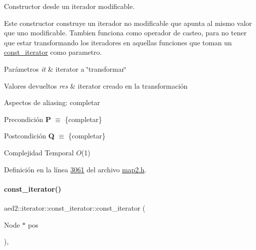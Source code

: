 Constructor desde un iterador modificable. 

Este constructor construye un iterador no modificable que apunta al mismo valor que uno modificable. Tambien funciona como operador de casteo, para no tener que estar transformando los iteradores en aquellas funciones que toman un {\ttfamily \hyperlink{classaed2_1_1iterator_1_1const__iterator}{const\+\_\+iterator}} como parametro.


\begin{DoxyParams}{Parámetros}
{\em it} & iterator a \char`\"{}transformar\char`\"{} \\
\hline
\end{DoxyParams}

\begin{DoxyRetVals}{Valores devueltos}
{\em res} & iterator creado en la transformación\\
\hline
\end{DoxyRetVals}
\begin{DoxyParagraph}{Aspectos de aliasing\+:}
completar
\end{DoxyParagraph}
\begin{DoxyPrecond}{Precondición}
{\bfseries P} $\equiv$ \{completar\} 
\end{DoxyPrecond}
\begin{DoxyPostcond}{Postcondición}
{\bfseries Q} $\equiv$ \{completar\}
\end{DoxyPostcond}

\begin{DoxyDescription}
\item[Complejidad Temporal]$O$(1)
\end{DoxyDescription}

Definición en la línea \hyperlink{map2_8h_source_l03061}{3061} del archivo \hyperlink{map2_8h_source}{map2.\+h}.

\mbox{\label{classaed2_1_1iterator_1_1const__iterator_a8ef6d37dab4cd4ccad630fd0fa6cf28a_a8ef6d37dab4cd4ccad630fd0fa6cf28a}} 
\paragraph{\texorpdfstring{const\+\_\+iterator()}{const\_iterator()}\hspace{0.1cm}{\footnotesize\ttfamily [3/3]}}
{\footnotesize\ttfamily aed2\+::iterator\+::const\+\_\+iterator\+::const\+\_\+iterator (\begin{DoxyParamCaption}\item[{Node $\ast$}]{pos }\end{DoxyParamCaption})\hspace{0.3cm}{\ttfamily [inline]}, {\ttfamily [private]}}



